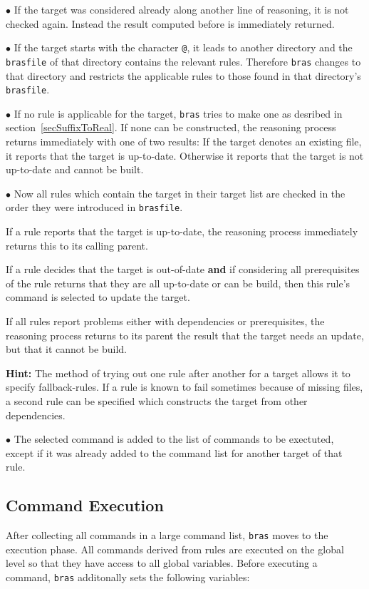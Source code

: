 \documentclass[12pt]{article}
\newcommand{\bras}{\texttt{bras}}
\begin{document}
$\bullet$ If the target was considered already along another line of
reasoning, it is not checked again. Instead the result computed before
is immediately returned.

$\bullet$ If the target starts with the character \texttt{@}, it leads
to another directory and the \texttt{brasfile} of that directory
contains the relevant rules. Therefore \bras{} changes to that
directory and restricts the applicable rules to those found in that
directory's \texttt{brasfile}.

$\bullet$ If no rule is applicable for the target, \bras{} tries to
make one as desribed in section~\ref{secSuffixToReal}. If none can be
constructed, the reasoning process returns immediately with one of two
results: If the target denotes an existing file, it reports that the
target is up-to-date. Otherwise it reports that the target is not
up-to-date and cannot be built.

$\bullet$ Now all rules which contain the target in their target list
are checked in the order they were introduced in
\texttt{brasfile}. 

If a rule reports that the target is up-to-date,
the reasoning process immediately returns this to its calling parent.

If a rule decides that the target is out-of-date \textbf{and} if
considering all prerequisites of the rule returns that they are all
up-to-date or can be build, then this rule's command is selected to
update the target.

If all rules report problems either with dependencies or
prerequisites, the reasoning process returns to its parent the result
that the target needs an update, but that it cannot be build.

\textbf{Hint:} The method of trying out one rule after another for a target allows it
to specify fallback-rules. If a rule is known to fail sometimes
because of missing files, a second rule can be specified which
constructs the target from other dependencies.

$\bullet$ The selected command is added to the list of commands to be
exectuted, except if it was already added to the command
list for another target of that rule.

\subsection{Command Execution}
\label{secCmdExec}

After collecting all commands in a large command list, \bras{} moves
to the execution phase. All commands derived from rules are executed
on the global level so that they have access to all global
variables. Before executing a command, \bras{} additonally sets the
following variables:
\end{document}
